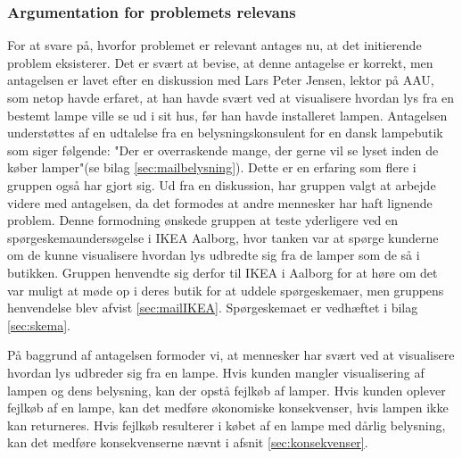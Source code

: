 \subsubsection{Argumentation for problemets relevans}
\label{sec:hvorfor_relavant}
For at svare på, hvorfor problemet er relevant antages nu, at det initierende problem eksisterer. Det er svært at bevise, at denne antagelse er korrekt, men antagelsen er lavet efter en diskussion med Lars Peter Jensen, lektor på AAU, som netop havde erfaret, at han havde svært ved at visualisere hvordan lys fra en bestemt lampe ville se ud i sit hus, før han havde installeret lampen. Antagelsen understøttes af en udtalelse fra en belysningskonsulent for en dansk lampebutik som siger følgende: "Der er overraskende mange, der gerne vil se lyset inden de køber lamper"(se bilag \ref{sec:mailbelysning}). Dette er en erfaring som flere i gruppen også har gjort sig. Ud fra en diskussion, har gruppen valgt at arbejde videre med antagelsen, da det formodes at andre mennesker har haft lignende problem. Denne formodning ønskede gruppen at teste yderligere ved en spørgeskemaundersøgelse i IKEA Aalborg, hvor tanken var at spørge kunderne om de kunne visualisere hvordan lys udbredte sig fra de lamper som de så i butikken. Gruppen henvendte sig derfor til IKEA i Aalborg for at høre om det var muligt at møde op i deres butik for at uddele spørgeskemaer, men gruppens henvendelse blev afvist \ref{sec:mailIKEA}. Spørgeskemaet er vedhæftet i bilag \ref{sec:skema}.

På baggrund af antagelsen formoder vi, at mennesker har svært ved at visualisere hvordan lys udbreder sig fra en lampe. Hvis kunden mangler visualisering af lampen og dens belysning, kan der opstå fejlkøb af lamper. Hvis kunden oplever fejlkøb af en lampe, kan det medføre økonomiske konsekvenser, hvis lampen ikke kan returneres. Hvis fejlkøb resulterer i købet af en lampe med dårlig belysning, kan det medføre konsekvenserne nævnt i afsnit \ref{sec:konsekvenser}.